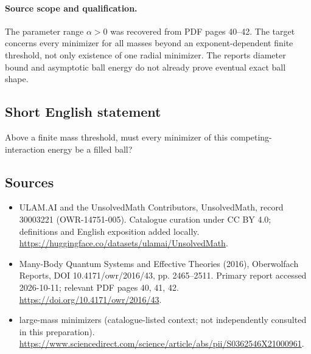 \documentclass[11pt]{article}
\begin{document}
\paragraph{Source scope and qualification.}
The parameter range $\alpha>0$ was recovered from PDF pages 40--42. The target concerns every minimizer for all masses beyond an exponent-dependent finite threshold, not only existence of one radial minimizer. The report\textquotesingle s diameter bound and asymptotic ball energy do not already prove eventual exact ball shape.
\subsection{Short English statement}
Above a finite mass threshold, must every minimizer of this competing-interaction energy be a filled ball?
\subsection{Sources}
\begin{itemize}
\item[\hypertarget{source:30003221:1}{S1}] ULAM.AI and the UnsolvedMath Contributors, UnsolvedMath, record 30003221 (OWR-14751-005). Catalogue curation under CC BY 4.0; definitions and English exposition added locally.
\url{https://huggingface.co/datasets/ulamai/UnsolvedMath}.
\item[\hypertarget{source:30003221:2}{S2}] Many-Body Quantum Systems and Effective Theories (2016), Oberwolfach Reports, DOI 10.4171/owr/2016/43, pp. 2465--2511. Primary report accessed 2026-10-11; relevant PDF pages 40, 41, 42.
\url{https://doi.org/10.4171/owr/2016/43}.
\item[\hypertarget{source:30003221:3}{S3}] large-mass minimizers (catalogue-listed context; not independently consulted in this preparation).
\url{https://www.sciencedirect.com/science/article/abs/pii/S0362546X21000961}.
\end{itemize}
\label{end:30003221}
\end{document}
